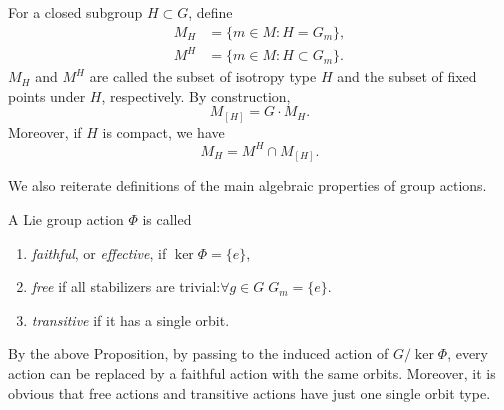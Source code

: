 \begin{defn}
    For a closed subgroup $H\subset G$, define
    \begin{align}
        M_H&=\{m\in M:H=G_m\},\\
        M^H&=\{m\in M:H\subset G_m\}.
    \end{align}
    $M_H$ and $M^H$ are called the subset of isotropy type $H$ and the subset of fixed points under $H$, respectively. By construction,
    \[M_{[H]}=G\cdot M_H.\]
    Moreover, if $H$ is compact, we have 
    \[M_H=M^H\cap M_{[H]}.\]
\end{defn}


We also reiterate definitions of the main algebraic properties of group actions.

\begin{defn}
    A Lie group action $\Phi$ is called
    \begin{enumerate}
        \item \emph{faithful}, or \emph{effective}, if $\ker\Phi=\{e\}$,
        \item \emph{free} if all stabilizers are trivial:$\forall g\in G\; G_m=\{e\}$.
        \item \emph{transitive} if it has a single orbit.
    \end{enumerate}
\end{defn}

By the above Proposition, by passing to the induced action of $G\slash\ker\Phi$, every action can be replaced by a faithful action with the same orbits. Moreover, it is obvious that free actions and transitive actions have just one single orbit type.

